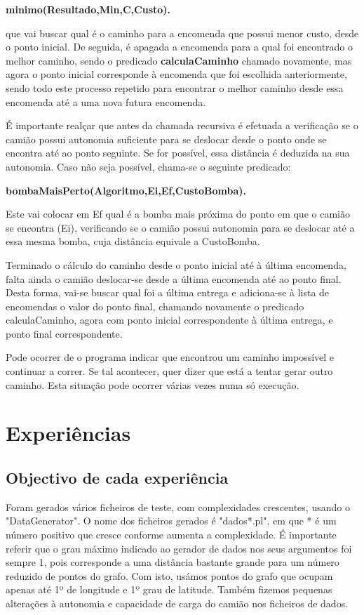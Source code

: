 \documentclass[a4paper]{article}
\begin{document}
\centerline{\textbf{minimo(Resultado,Min,C,Custo).}}

que vai buscar qual é o caminho para a encomenda que possui menor custo, desde o ponto inicial. De seguida, é apagada a encomenda para a qual foi encontrado o melhor caminho, sendo o predicado \textbf{calculaCaminho} chamado novamente, mas agora o ponto inicial corresponde à encomenda que foi escolhida anteriormente, sendo todo este processo repetido para encontrar o melhor caminho desde essa encomenda até a uma nova futura encomenda.

É importante realçar que antes da chamada recursiva é efetuada a verificação se o camião possui autonomia suficiente para se deslocar desde o ponto onde se encontra até ao ponto seguinte. Se for possível, essa distância é deduzida na sua autonomia. Caso não seja possível, chama-se o seguinte predicado:

\centerline{\textbf{bombaMaisPerto(Algoritmo,Ei,Ef,CustoBomba).}}

Este vai colocar em Ef qual é a bomba mais próxima do ponto em que o camião se encontra (Ei), verificando se o camião possui autonomia para se deslocar até a essa mesma bomba, cuja distância equivale a CustoBomba. 

Terminado o cálculo do caminho desde o ponto inicial até à última encomenda, falta ainda o camião deslocar-se desde a última encomenda até ao ponto final. Desta forma, vai-se buscar qual foi a última entrega e adiciona-se à lista de encomendas o valor do ponto final, chamando novamente o predicado calculaCaminho, agora com ponto inicial correspondente à última entrega, e ponto final correspondente.

Pode ocorrer de o programa indicar que encontrou um caminho impossível e continuar a correr. Se tal acontecer, quer dizer que está a tentar gerar outro caminho. Esta situação pode ocorrer várias vezes numa só execução.

\newpage

\section{Experiências}

\subsection{Objectivo de cada experiência}
Foram gerados vários ficheiros de teste, com complexidades crescentes, usando o "DataGenerator". O nome dos ficheiros gerados é "dados*.pl", em que * é um número positivo que cresce conforme aumenta a complexidade. É importante referir que o grau máximo indicado ao gerador de dados nos seus argumentos foi sempre 1, pois corresponde a uma distância bastante grande para um número reduzido de pontos do grafo. Com isto, usámos pontos do grafo que ocupam apenas até 1º de longitude e 1º grau de latitude. Também fizemos pequenas alterações à autonomia e capacidade de carga do camião nos ficheiros de dados.
\end{document}

